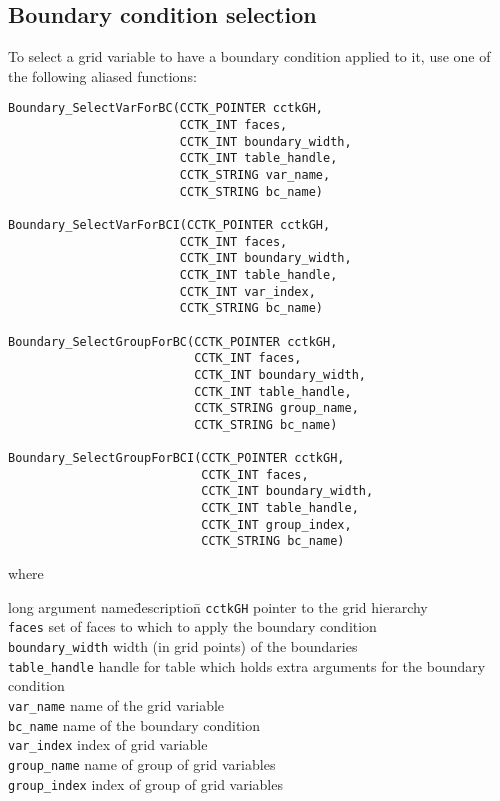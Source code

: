 \documentclass{article}
\begin{document}
\subsection{Boundary condition selection}

To select a grid variable to have a boundary condition applied to it,
use one of the following aliased functions:
\begin{verbatim}
Boundary_SelectVarForBC(CCTK_POINTER cctkGH,
                        CCTK_INT faces,
                        CCTK_INT boundary_width,
                        CCTK_INT table_handle, 
                        CCTK_STRING var_name, 
                        CCTK_STRING bc_name)

Boundary_SelectVarForBCI(CCTK_POINTER cctkGH,
                        CCTK_INT faces,
                        CCTK_INT boundary_width,
                        CCTK_INT table_handle, 
                        CCTK_INT var_index, 
                        CCTK_STRING bc_name)

Boundary_SelectGroupForBC(CCTK_POINTER cctkGH,
                          CCTK_INT faces,
                          CCTK_INT boundary_width,
                          CCTK_INT table_handle, 
                          CCTK_STRING group_name, 
                          CCTK_STRING bc_name)

Boundary_SelectGroupForBCI(CCTK_POINTER cctkGH,
                           CCTK_INT faces,
                           CCTK_INT boundary_width,
                           CCTK_INT table_handle, 
                           CCTK_INT group_index, 
                           CCTK_STRING bc_name)
\end{verbatim}
where
\begin{tabbing}
long argument name\= description\=\kill
\texttt{cctkGH} \> pointer to the grid hierarchy\\
\texttt{faces} \> set of faces to which to apply the boundary condition\\
\texttt{boundary\_width} \> width (in grid points) of the boundaries\\
\texttt{table\_handle} \> handle for table which holds extra arguments for the boundary condition\\
\texttt{var\_name} \> name of the grid variable\\
\texttt{bc\_name} \> name of the boundary condition\\
\texttt{var\_index} \> index of grid variable\\
\texttt{group\_name} \> name of group of grid variables\\
\texttt{group\_index} \> index of group of grid variables
\end{tabbing}
\end{document}
